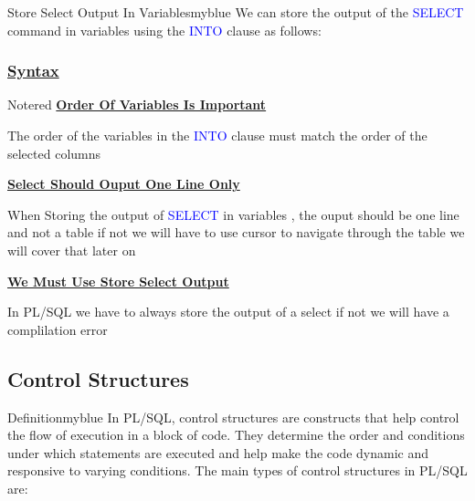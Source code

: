 \begin{prettyBox}{Store Select Output In Variables}{myblue}
We can store the output of the \textcolor{blue}{SELECT} command in variables using the \textcolor{blue}{INTO} clause as follows:
\end{prettyBox}

\subsubsection*{\underline{Syntax}}



\vspace{0.25cm}

\begin{prettyBox}{Note}{red}
\textbf{\underline{Order Of Variables Is Important}}

\vspace{0.15cm}
The order of the variables in the \textcolor{blue}{INTO} clause must match the order of the selected columns

\vspace{0.25cm}
\textbf{\underline{Select Should Ouput One Line Only}}

\vspace{0.15cm}
When Storing the output of \textcolor{blue}{SELECT} in variables , the ouput should be one line and not a table
if not we will have to use cursor to navigate through the table we will cover that later on


\vspace{0.25cm}

\textbf{\underline{We Must Use Store Select Output}}

\vspace{0.15cm}
In PL/SQL we have to always store the output of a select if not we will have a complilation error
\end{prettyBox}

\vspace{0.5cm}
\subsection{Control Structures}

\begin{prettyBox}{Definition}{myblue}
In PL/SQL, control structures are constructs that help control the flow of execution in a block of code.
They determine the order and conditions under which statements are executed and help make the code dynamic
and responsive to varying conditions. The main types of control structures in PL/SQL are:
\end{prettyBox}

